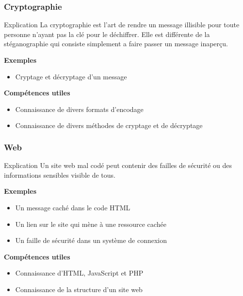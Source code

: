 \documentclass{beamer}
\begin{document}

\begin{frame}
\frametitle{Cryptographie}

\begin{block}{Explication}
    La cryptographie est l'art de rendre un message illisible pour toute personne n'ayant pas la clé pour le déchiffrer. Elle est différente de la stéganographie qui consiste simplement a faire passer un message inaperçu.
\end{block}

\pause

\textbf{Exemples}
\begin{itemize}
    \item Cryptage et décryptage d'un message 
\end{itemize}

\pause

\textbf{Compétences utiles}
\begin{itemize}
    \item Connaissance de divers formats d'encodage
    \item Connaissance de divers méthodes de cryptage et de décryptage
\end{itemize}

\end{frame}


\begin{frame}
\frametitle{Web}


\begin{block}{Explication}
    Un site web mal codé peut contenir des failles de sécurité ou des informations sensibles visible de tous.
\end{block}

\pause

\textbf{Exemples}
\begin{itemize}
    \item Un message caché dans le code HTML
    \item Un lien sur le site qui mène à une ressource cachée
    \item Un faille de sécurité dans un système de connexion
\end{itemize}

\pause

\textbf{Compétences utiles}
\begin{itemize}
    \item Connaissance d'HTML, JavaScript et PHP
    \item Connaissance de la structure d'un site web
\end{itemize}


\end{frame}
\end{document}
